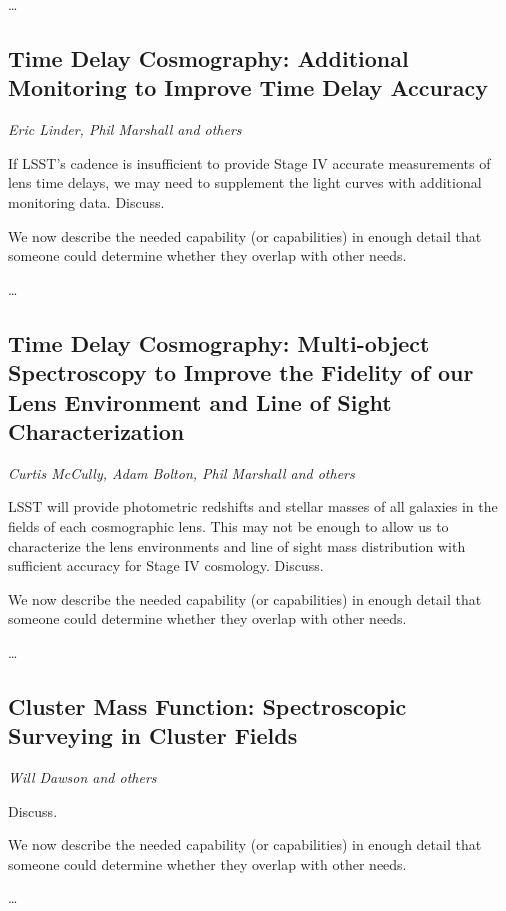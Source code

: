 \ldots


\subsection{Time Delay Cosmography: Additional Monitoring to Improve Time Delay Accuracy}
{\it Eric Linder, Phil Marshall and others}

If LSST's cadence is insufficient to provide Stage IV accurate
measurements of lens time delays, we may need to supplement the light
curves with additional monitoring data. Discuss.

We now describe the needed capability (or capabilities) in enough detail
that someone could determine whether they overlap with other needs.

\ldots


\subsection{Time Delay Cosmography: Multi-object Spectroscopy to Improve the Fidelity of our Lens Environment and Line of Sight Characterization}
{\it Curtis McCully, Adam Bolton, Phil Marshall and others}

LSST will provide photometric redshifts and stellar masses of all
galaxies in the fields of each cosmographic lens. This may not be enough
to allow us to characterize the lens environments and line of sight mass
distribution with sufficient accuracy for Stage IV cosmology. Discuss.

We now describe the needed capability (or capabilities) in enough detail
that someone could determine whether they overlap with other needs.

\ldots


\subsection{Cluster Mass Function: Spectroscopic Surveying in Cluster Fields}
\label{sec:sl:clusters}
{\it Will Dawson and others}

Discuss.

We now describe the needed capability (or capabilities) in enough detail
that someone could determine whether they overlap with other needs.

\ldots

